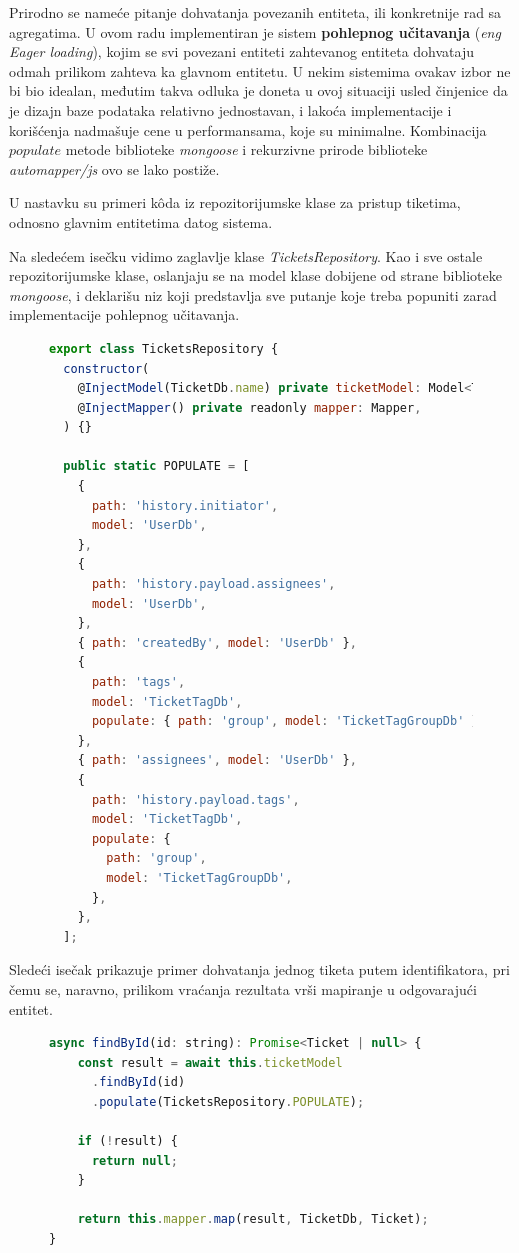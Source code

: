 \documentclass[12pt,oneside]{memoir}
\begin{document}
Prirodno se nameće pitanje dohvatanja povezanih entiteta, ili konkretnije rad sa agregatima. U ovom radu implementiran je sistem \textbf{pohlepnog učitavanja} (\textit{eng Eager loading}), kojim se svi povezani entiteti zahtevanog entiteta dohvataju odmah prilikom zahteva ka glavnom entitetu. U nekim sistemima ovakav izbor ne bi bio idealan, međutim takva odluka je doneta u ovoj situaciji usled činjenice da je dizajn baze podataka relativno jednostavan, i lakoća implementacije i korišćenja nadmašuje cene u performansama, koje su minimalne. Kombinacija $populate$ metode biblioteke \textit{mongoose} i rekurzivne prirode biblioteke \textit{automapper/js} ovo se lako postiže.

U nastavku su primeri k\^{o}da iz repozitorijumske klase za pristup tiketima, odnosno glavnim entitetima datog sistema.

Na sledećem isečku vidimo zaglavlje klase \textit{TicketsRepository}. Kao i sve ostale repozitorijumske klase, oslanjaju se na model klase dobijene od strane biblioteke \textit{mongoose}, i deklarišu niz koji predstavlja sve putanje koje treba popuniti zarad implementacije pohlepnog učitavanja.

\begin{figure}[h]
\begin{lstlisting}[language=JavaScript, style=ES6, caption={Fajl \textit{tickets.repository.ts}, konstrukcija i niz POPULATE}]
export class TicketsRepository {
  constructor(
    @InjectModel(TicketDb.name) private ticketModel: Model<TicketDb>,
    @InjectMapper() private readonly mapper: Mapper,
  ) {}

  public static POPULATE = [
    {
      path: 'history.initiator',
      model: 'UserDb',
    },
    {
      path: 'history.payload.assignees',
      model: 'UserDb',
    },
    { path: 'createdBy', model: 'UserDb' },
    {
      path: 'tags',
      model: 'TicketTagDb',
      populate: { path: 'group', model: 'TicketTagGroupDb' },
    },
    { path: 'assignees', model: 'UserDb' },
    {
      path: 'history.payload.tags',
      model: 'TicketTagDb',
      populate: {
        path: 'group',
        model: 'TicketTagGroupDb',
      },
    },
  ];
\end{lstlisting}
\end{figure}

\newpage
Sledeći isečak prikazuje primer dohvatanja jednog tiketa putem identifikatora, pri čemu se, naravno, prilikom vraćanja rezultata vrši mapiranje u odgovarajući entitet.

\begin{figure}[h]
\begin{lstlisting}[language=JavaScript, style=ES6, caption={Fajl \textit{tickets.repository.ts}, dohvatanje entiteta}]
async findById(id: string): Promise<Ticket | null> {
    const result = await this.ticketModel
      .findById(id)
      .populate(TicketsRepository.POPULATE);
    
    if (!result) {
      return null;
    }
    
    return this.mapper.map(result, TicketDb, Ticket);
}
\end{lstlisting}
\end{figure}
\end{document}
